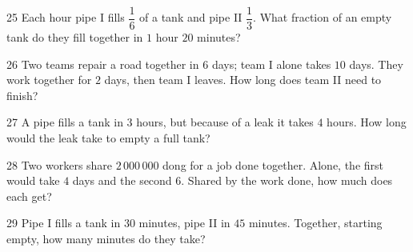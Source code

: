 \gap
\begin{probbox}{25}{\relax}
Each hour pipe I fills $\dfrac16$ of a tank and pipe II $\dfrac13$. What fraction of an empty tank do they fill together in $1$ hour $20$ minutes?
\end{probbox}
\gap
\begin{probbox}{26}{\relax}
Two teams repair a road together in $6$ days; team I alone takes $10$ days. They work together for $2$ days, then team I leaves. How long does team II need to finish?
\end{probbox}
\gap
\begin{probbox}{27}{\relax}
A pipe fills a tank in $3$ hours, but because of a leak it takes $4$ hours. How long would the leak take to empty a full tank?
\end{probbox}
\gap
\begin{probbox}{28}{\relax}
Two workers share $2\,000\,000$ dong for a job done together. Alone, the first would take $4$ days and the second $6$. Shared by the work done, how much does each get?
\end{probbox}
\gap
\begin{probbox}{29}{\relax}
Pipe I fills a tank in $30$ minutes, pipe II in $45$ minutes. Together, starting empty, how many minutes do they take?
\end{probbox}
